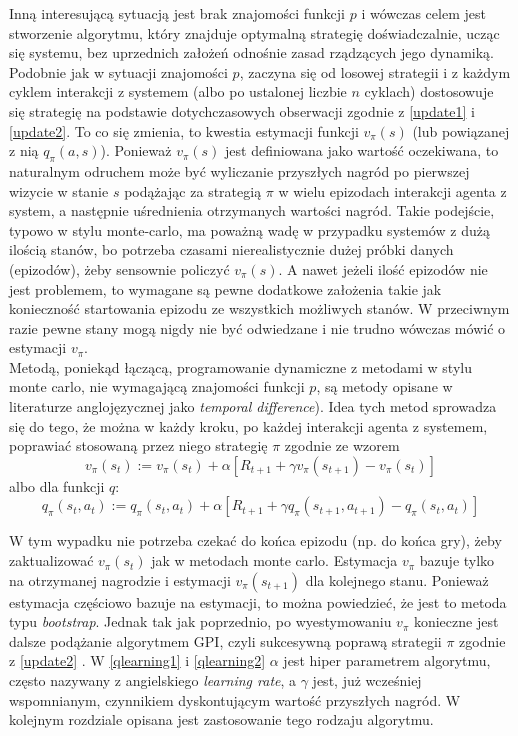 \documentclass[licencjacka]{pracamgr}
\begin{document}
Inną interesującą sytuacją jest brak znajomości funkcji $p$ i wówczas celem jest stworzenie algorytmu, który znajduje optymalną strategię doświadczalnie, ucząc się systemu, bez uprzednich założeń odnośnie zasad rządzących  jego dynamiką.  Podobnie jak  w sytuacji znajomości $p$,  zaczyna się od losowej strategii i z każdym cyklem interakcji z systemem (albo po ustalonej liczbie  $n$ cyklach) dostosowuje się strategię na podstawie dotychczasowych obserwacji zgodnie z \ref{update1} i \ref{update2}. To co się zmienia, to kwestia estymacji funkcji $v_{\pi}(s)$ (lub powiązanej z nią $q_{\pi}(a,s)$). Ponieważ $v_{\pi}(s)$ jest definiowana jako wartość oczekiwana, to naturalnym odruchem może być wyliczanie przyszłych nagród po pierwszej wizycie w stanie $s$ podążając za strategią $\pi$ w wielu epizodach interakcji agenta z system, a następnie uśrednienia otrzymanych wartości nagród. Takie podejście, typowo w stylu monte-carlo, ma poważną wadę w przypadku systemów z dużą ilością stanów, bo potrzeba czasami nierealistycznie dużej próbki danych (epizodów), żeby sensownie policzyć  $v_{\pi}(s)$. A nawet jeżeli ilość epizodów nie jest problemem, to wymagane są pewne dodatkowe założenia takie jak konieczność startowania epizodu ze wszystkich możliwych stanów. W przeciwnym razie pewne stany mogą nigdy nie być odwiedzane i nie trudno wówczas mówić o estymacji $v_{\pi}$.  \\
 
 Metodą, poniekąd łączącą, programowanie dynamiczne z metodami w stylu monte carlo, nie wymagającą znajomości funkcji $p$, są metody opisane w literaturze anglojęzycznej jako \textit{temporal difference}).  Idea tych metod sprowadza się do tego, że można w każdy kroku, po każdej interakcji agenta z systemem, poprawiać stosowaną przez niego strategię $\pi$ zgodnie ze wzorem
\begin{equation}\label{qlearning1}
   v_{\pi}(s_{t}) := v_{\pi}(s_{t}) +\alpha [R_{t+1} + \gamma v_{\pi}(s_{t+1}) - v_{\pi}(s_{t})]
 \end{equation}
 albo dla funkcji $q$:
\begin{equation}\label{qlearning2}
   q_{\pi}(s_{t}, a_{t}) := q_{\pi}(s_{t},a_{t}) +\alpha [R_{t+1} + \gamma q_{\pi}(s_{t+1}, a_{t+1}) - q_{\pi}(s_{t},a_{t})]
 \end{equation}
 
 W tym wypadku nie potrzeba czekać do końca epizodu (np. do końca gry), żeby zaktualizować $v_{\pi}(s_{t})$ jak w metodach monte carlo. Estymacja $v_{\pi}$  bazuje tylko na otrzymanej nagrodzie i estymacji $v_{\pi}(s_{t+1})$ dla kolejnego stanu. Ponieważ estymacja częściowo bazuje na estymacji, to można powiedzieć, że jest to metoda typu \textit{bootstrap}. Jednak tak jak poprzednio, po wyestymowaniu $v_{\pi}$ konieczne jest dalsze podążanie algorytmem GPI, czyli sukcesywną poprawą strategii $\pi$ zgodnie z \ref{update2} .   W \ref{qlearning1} i \ref{qlearning2}  $\alpha$ jest hiper parametrem algorytmu, często nazywany z angielskiego \textit{learning rate}, a $\gamma$ jest, już wcześniej wspomnianym, czynnikiem dyskontującym wartość przyszłych nagród. W kolejnym rozdziale opisana jest zastosowanie tego rodzaju algorytmu. \\
 
\end{document}
